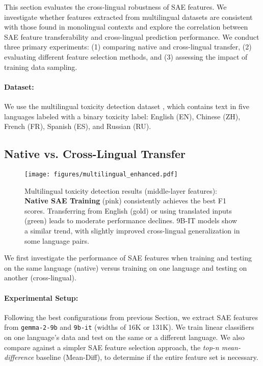 This section evaluates the cross-lingual robustness of SAE features. We investigate whether features extracted from multilingual datasets are consistent with those found in monolingual contexts and explore the correlation between SAE feature transferability and cross-lingual prediction performance.  We conduct three primary experiments: (1) comparing native and cross-lingual transfer, (2) evaluating different feature selection methods, and (3) assessing the impact of training data sampling.

\paragraph{Dataset:}
We use the multilingual toxicity detection dataset \cite{dementieva2024overview}, which contains text in five languages labeled with a binary toxicity label: English (EN), Chinese (ZH), French (FR), Spanish (ES), and Russian (RU).

\subsection{Native vs. Cross-Lingual Transfer}

\begin{figure}[t]
    \centering
    \texttt{[image: figures/multilingual\_enhanced.pdf]}
    \vspace{-0.2cm} %
    \caption{Multilingual toxicity detection results (middle-layer features): \textbf{Native SAE Training} (pink) consistently achieves the best F1 scores. Transferring from English (gold) or using translated inputs (green) leads to moderate performance declines. 9B-IT models show a similar trend, with slightly improved cross-lingual generalization in some language pairs.}
    \label{fig:multilingual}
\end{figure}

We first investigate the performance of SAE features when training and testing on the same language (native) versus training on one language and testing on another (cross-lingual).

\paragraph{Experimental Setup:}
Following the best configurations from previous Section, we extract SAE features from \texttt{gemma-2-9b} and \texttt{9b-it} (widths of 16K or 131K). We train linear classifiers on one language's data and test on the same or a different language. We also compare against a simpler SAE feature selection approach, the \emph{top-n mean-difference} baseline (Mean-Diff), to determine if the entire feature set is necessary.


